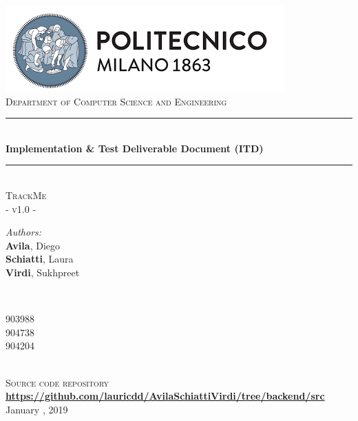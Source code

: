 \documentclass[a4paper, hidelinks, 12pt]{report}
\begin{document}
	\begin{titlepage}
		\centering
		\vspace*{0.7 cm}
		\includegraphics[scale = 0.85]{../Assets/PolimiLogo.png}\\[1.6 cm]
		\textsc{\large Department of Computer Science and Engineering}\\[1.8 cm]
		
		\rule{\linewidth}{0.2 mm} \\[0.4 cm]
		{ \huge \bfseries Implementation \& Test Deliverable Document (ITD)}\\
		\rule{\linewidth}{0.2 mm} \\[1.5 cm]
		
		\textsc{\Large TrackMe}\\[0.5 cm]
		\textsc{\large - v1.0 -}\\[1 cm]
		
		\begin{minipage}{0.4\textwidth}
			\begin{flushleft} \large
				\emph{Authors:}\\
				\textbf{Avila}, Diego \\
				\textbf{Schiatti}, Laura \\
				\textbf{Virdi}, Sukhpreet
			\end{flushleft}
		\end{minipage}~
		\begin{minipage}{0.4\textwidth}
			\begin{flushright} \large
				903988 \\
				904738 \\
				904204
			\end{flushright}
		\end{minipage}\\[2 cm]
				
		\textsc{\large Source code repository}
		\href{https://github.com/lauricdd/AvilaSchiattiVirdi/tree/backend/src}{\textbf{https://github.com/lauricdd/AvilaSchiattiVirdi/tree/backend/src}}\\[1 cm]
		
		{\large January  , 2019}\\[2 cm]
		
		\vfill
	\end{titlepage}
	
\end{document}
